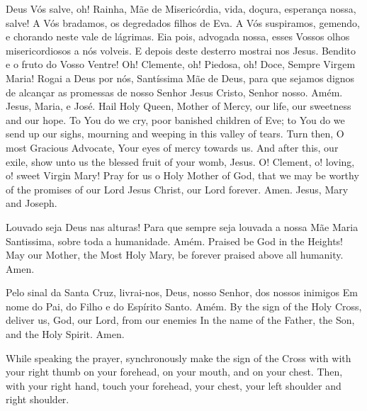   \beginverse
    Deus Vós salve, oh! Rainha, Mãe de Misericórdia,
    vida, doçura, esperança nossa, salve!
    \parspace
    A Vós bradamos, os degredados filhos de Eva.
    \parspace
    A Vós suspiramos, gemendo, e chorando neste vale de
    lágrimas.
    \parspace
    Eia pois, advogada nossa, esses Vossos olhos
    misericordiosos a nós volveis.
    \parspace
    E depois deste desterro mostrai nos Jesus.
    \parspace
    Bendito e o fruto do Vosso Ventre!
    \parspace
    Oh! Clemente, oh! Piedosa, oh! Doce, Sempre Virgem
    Maria!
    \parspace
    Rogai a Deus por nós, Santíssima Mãe de Deus, para
    que sejamos dignos de alcançar as promessas de nosso
    Senhor Jesus Cristo, Senhor nosso.
    \parspace
    Amém. Jesus, Maria, e José.
  \endverse
  \beginverse
    Hail Holy Queen, Mother of Mercy, our life, our
    sweetness and our hope.
    \parspace
    To You do we cry, poor banished children of Eve;
    \parspace
    to You do we send up our sighs, mourning and weeping
    in this valley of tears.
    \parspace
    Turn then, O most Gracious Advocate, Your eyes of
    mercy towards us.
    \parspace
    And after this, our exile, show unto us the blessed
    fruit of your womb, Jesus.
    \parspace
    O! Clement, o! loving, o! sweet Virgin Mary!
    \parspace
    Pray for us o Holy Mother of God, that we may be
    worthy of the promises of our Lord Jesus Christ,
    our Lord forever.
    \parspace
    Amen. Jesus, Mary and Joseph.
  \endverse
\endsong


  \beginverse
    Louvado seja Deus nas alturas!
    Para que sempre seja louvada
    a nossa Mãe Maria Santissima,
    sobre toda a humanidade.
    Amém.
  \endverse
  \beginverse
    Praised be God in the Heights!
    May our Mother, the Most Holy Mary,
    be forever praised above all humanity.
    Amen.
  \endverse
\endsong


  \beginverse
    Pelo sinal da Santa Cruz,
    livrai-nos, Deus, nosso Senhor,
    dos nossos inimigos
    \parspace
    Em nome do Pai,
    do Filho e
    do Espírito Santo.
    \parspace
    Amém.
  \endverse
  \beginverse
    By the sign of the Holy Cross,
    deliver us, God, our Lord,
    from our enemies
    \parspace
    In the name of the Father,
    the Son, and
    the Holy Spirit.
    \parspace
    Amen.
  \endverse
  \begin{note}
    While speaking the prayer, synchronously make
    the sign of the Cross with with your right thumb
    on your forehead,
    on your mouth, and
    on your chest.
    \parspace
    Then, with your right hand, touch
    your forehead,
    your chest,
    your left shoulder and right shoulder.
  \end{note}
\endsong
